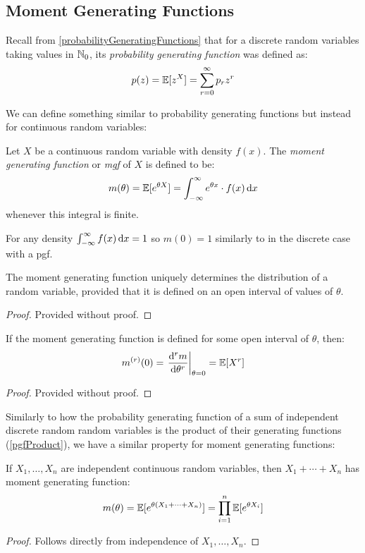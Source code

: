 \documentclass[../main.tex]{subfiles}
\begin{document}
\subsection{Moment Generating Functions}
\begin{remark}[Recap]
  Recall from \cref{probabilityGeneratingFunctions} that for a discrete random variables taking values in $\mathbb{N}_0$, its \textit{probability generating function} was defined as:
  \[
    p(z) = \mathbb{E}[z^{X}] = \sum_{r = 0}^{\infty} p_r z^{r}
  \]
\end{remark}
We can define something similar to probability generating functions but instead for continuous random variables:
\begin{definition}
  Let $X$ be a continuous random variable with density $f(x)$.
  The \textit{moment generating function} or \textit{mgf} of $X$ is defined to be: \label{mgfDef}
  \[
    m(\theta) = \E[e^{\theta X}] = \int_{-\infty}^{\infty} e^{\theta x} \cdot f(x) \d{x}
  \]
  whenever this integral is finite.
\end{definition}
For any density $\int_{-\infty}^{\infty} f(x) \d{x} = 1$ so $m(0) = 1$ similarly to in the discrete case with a pgf.
\begin{theorem}
  The moment generating function uniquely determines the distribution of a random variable, provided that it is defined on an open interval of values of $\theta$. \label{mgfUnique}
\end{theorem}
\begin{proof}
  Provided without proof.
\end{proof}
\begin{theorem}
  If the moment generating function is defined for some open interval of $\theta$, then:
  \[
    m^{(r)}(0) = \at{\deriv[r]{m}{\theta}}{\theta = 0} = \E[X^{r}]
  \]
\end{theorem}
\begin{proof}
  Provided without proof.
\end{proof}
Similarly to how the probability generating function of a sum of independent discrete random random variables is the product of their generating functions (\cref{pgfProduct}), we have a similar property for moment generating functions:
\begin{proposition}
  If $X_1, \ldots, X_n$ are independent continuous random variables, then $X_1 + \cdots + X_n$ has moment generating function: \label{mgfProduct}
  \[
    m(\theta) = \mathbb{E}[e^{\theta(X_1 + \cdots + X_n)}] = \prod_{i = 1}^{n} \mathbb{E}[e^{\theta X_i}]
  \]
\end{proposition}
\begin{proof}
  Follows directly from independence of $X_1, \ldots, X_n$.
\end{proof}
\end{document}
